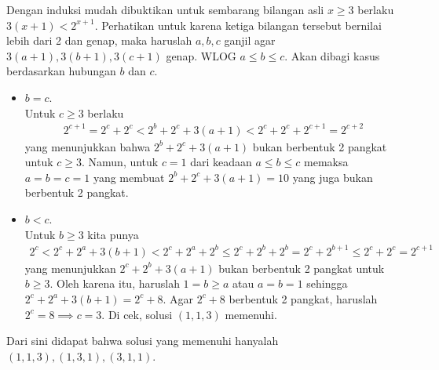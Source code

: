 
\begin{solusi}
    Dengan induksi mudah dibuktikan untuk sembarang bilangan asli $x \ge 3$  berlaku $3(x+1) < 2^{x+1}$. Perhatikan untuk karena ketiga bilangan tersebut bernilai lebih dari 2 dan genap, maka haruslah $a,b,c$ ganjil agar $3(a+1),3(b+1),3(c+1)$ genap.
    WLOG $a \le b \le c$. Akan dibagi kasus berdasarkan hubungan $b$ dan $c$.

    \begin{itemize}
        \item $b = c$.\\
        Untuk $c \ge 3$ berlaku
        \begin{align*}
            2^{c+1} = 2^c + 2^c < 2^b + 2^c + 3(a+1) < 2^c + 2^c +2^{c+1} = 2^{c+2}
        \end{align*}
        yang menunjukkan bahwa $2^b + 2^c + 3(a+1)$ bukan berbentuk 2 pangkat untuk $c \ge 3$. Namun, untuk $c=1$ dari keadaan $a \le b \le c$ memaksa $a=b=c=1$ yang membuat $2^b+2^c+3(a+1)=10$ yang juga bukan berbentuk 2 pangkat.

        \item $b < c$.\\
        Untuk $b \ge 3$ kita punya
        \begin{align*}
            2^{c} < 2^c + 2^a + 3(b+1) < 2^c + 2^a + 2^b \le 2^c + 2^b + 2^b = 2^c + 2^{b+1} \le 2^c + 2^c = 2^{c+1}
        \end{align*}
        yang menunjukkan $2^c + 2^b + 3(a+1)$ bukan berbentuk 2 pangkat untuk $b \ge 3$. Oleh karena itu, haruslah $1 = b \ge a$ atau $a=b=1$ sehingga $2^c+2^a+3(b+1)=2^c+8$. Agar $2^c+8$ berbentuk 2 pangkat, haruslah $2^c=8 \implies c=3$. Di cek, solusi $(1,1,3)$ memenuhi.
    \end{itemize}
    Dari sini didapat bahwa solusi yang memenuhi hanyalah $(1,1,3), (1,3,1), (3,1,1)$.
\end{solusi}